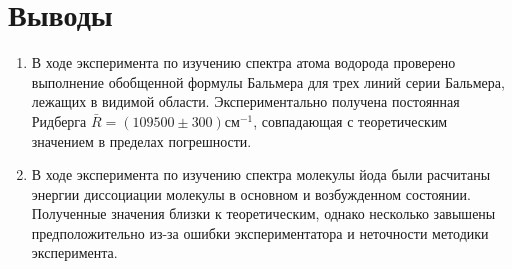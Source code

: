 \documentclass[a4paper,12pt]{article} %
\begin{document}
\section*{Выводы}
\begin{enumerate}
    \item В ходе эксперимента по изучению спектра атома водорода проверено выполнение обобщенной формулы Бальмера для трех линий серии Бальмера, лежащих в видимой области.\newline
    Экспериментально получена постоянная Ридберга $\bar R = (109500 \pm 300) \text{см}^{-1}$, совпадающая с теоретическим значением в пределах погрешности.
    \item В ходе эксперимента по изучению спектра молекулы йода были расчитаны энергии диссоциации молекулы в основном и возбужденном состоянии. Полученные значения близки к теоретическим, однако несколько завышены предположительно из-за ошибки экспериментатора и неточности методики эксперимента.
\end{enumerate}
\end{document}
